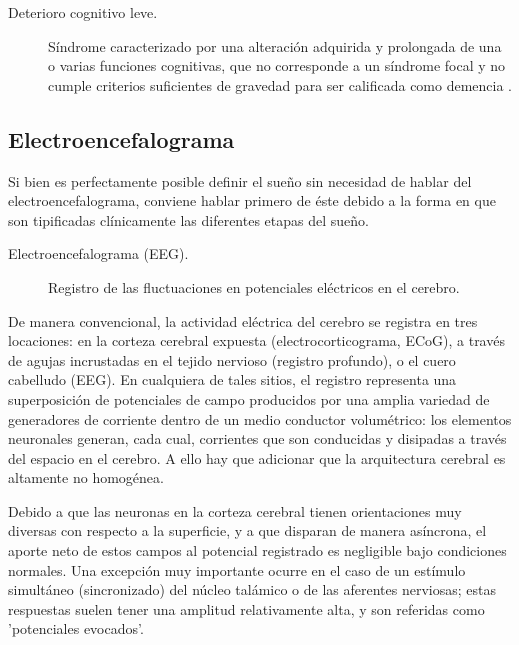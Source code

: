 \begin{description}
\item[Deterioro cognitivo leve.] S\'indrome caracterizado por una alteraci\'on adquirida y 
prolongada de una o varias funciones cognitivas, que no corresponde a un s\'indrome focal y no 
cumple criterios suficientes de gravedad para ser calificada como demencia \cite{Robles02}.
\end{description}


\subsection{Electroencefalograma}

Si bien es perfectamente posible definir el sue\~no sin necesidad de hablar del 
electroencefalograma, conviene hablar primero de \'este debido a la forma en que son tipificadas
cl\'inicamente las diferentes etapas del sue\~no.

\begin{description}
\item[Electroencefalograma (EEG).] Registro de las fluctuaciones en potenciales el\'ectricos en el 
cerebro.
\end{description}

De manera convencional, la actividad el\'ectrica del cerebro se registra en tres locaciones: en la 
corteza cerebral expuesta (electrocorticograma, ECoG), a trav\'es de agujas incrustadas en el 
tejido nervioso (registro profundo), o el cuero cabelludo (EEG).
En cualquiera de tales sitios, el registro representa una superposici\'on de potenciales de campo 
producidos por una amplia variedad de generadores de corriente dentro de un medio conductor 
volum\'etrico: los elementos neuronales generan, cada cual, corrientes que son conducidas y 
disipadas a trav\'es del espacio en el cerebro.
A ello hay que adicionar que la arquitectura cerebral es altamente no homog\'enea.

Debido a que las neuronas en la corteza cerebral tienen orientaciones muy diversas con respecto a 
la superficie, y a que disparan de manera as\'incrona, el aporte neto de estos campos al potencial 
registrado es negligible bajo condiciones normales.
Una excepci\'on muy importante ocurre en el caso de un est\'imulo simult\'aneo (sincronizado)
del n\'ucleo tal\'amico o de las aferentes nerviosas; estas respuestas suelen tener una amplitud 
relativamente alta, y son referidas como 'potenciales evocados'.

